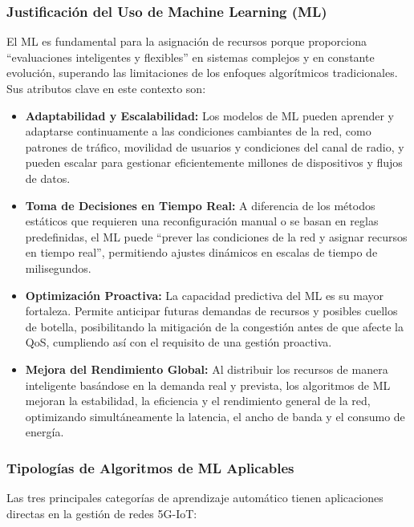 \documentclass[12pt,a4paper]{article}
\begin{document}
\subsubsection{Justificación del Uso de Machine Learning (ML)}

El ML es fundamental para la asignación de recursos porque proporciona ``evaluaciones inteligentes y flexibles'' en sistemas complejos y en constante evolución, superando las limitaciones de los enfoques algorítmicos tradicionales. Sus atributos clave en este contexto son:

\begin{itemize}
    \item \textbf{Adaptabilidad y Escalabilidad:} Los modelos de ML pueden aprender y adaptarse continuamente a las condiciones cambiantes de la red, como patrones de tráfico, movilidad de usuarios y condiciones del canal de radio, y pueden escalar para gestionar eficientemente millones de dispositivos y flujos de datos.
    
    \item \textbf{Toma de Decisiones en Tiempo Real:} A diferencia de los métodos estáticos que requieren una reconfiguración manual o se basan en reglas predefinidas, el ML puede ``prever las condiciones de la red y asignar recursos en tiempo real'', permitiendo ajustes dinámicos en escalas de tiempo de milisegundos\cite{ref9}.
    
    \item \textbf{Optimización Proactiva:} La capacidad predictiva del ML es su mayor fortaleza. Permite anticipar futuras demandas de recursos y posibles cuellos de botella, posibilitando la mitigación de la congestión antes de que afecte la QoS, cumpliendo así con el requisito de una gestión proactiva\cite{ref9}.
    
    \item \textbf{Mejora del Rendimiento Global:} Al distribuir los recursos de manera inteligente basándose en la demanda real y prevista, los algoritmos de ML mejoran la estabilidad, la eficiencia y el rendimiento general de la red, optimizando simultáneamente la latencia, el ancho de banda y el consumo de energía\cite{ref9}.
\end{itemize}

\subsubsection{Tipologías de Algoritmos de ML Aplicables}

Las tres principales categorías de aprendizaje automático tienen aplicaciones directas en la gestión de redes 5G-IoT\cite{ref32}:
\end{document}
